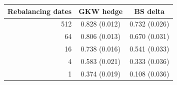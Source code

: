 \begin{tabular}{rcc}
\toprule
Rebalancing dates & GKW hedge & BS delta \\
\midrule
512 & 0.828 (0.012) & 0.732 (0.026) \\
64 & 0.806 (0.013) & 0.670 (0.031) \\
16 & 0.738 (0.016) & 0.541 (0.033) \\
4 & 0.583 (0.021) & 0.333 (0.036) \\
1 & 0.374 (0.019) & 0.108 (0.036) \\
\bottomrule
\end{tabular}
